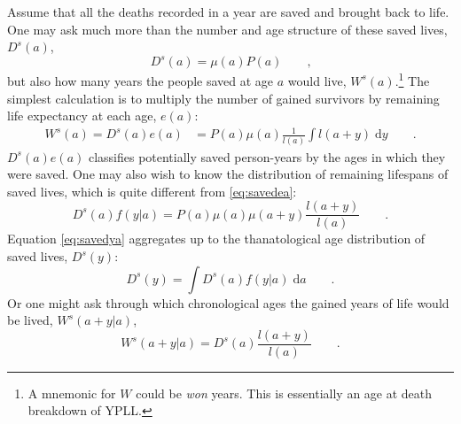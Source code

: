 \documentclass{article}
\newcommand{\dd}{\; \mathrm{d}}
\newcommand{\tc}{\quad\quad\text{,}}
\newcommand{\tp}{\quad\quad\text{.}}
\begin{document}
\begin{appendices}
Assume that all the deaths recorded in a year are saved and brought back to
life. One may ask much more than the number and age structure of these saved
lives, $D^s(a)$,
\begin{equation}
\label{eq:Dsa}
D^s(a) = \mu(a)P(a) \tc
\end{equation}
but also how many years the people saved at age $a$ would live, 
$W^s(a)$.\footnote{A mnemonic for $W$ could be \textit{won} years. This is
essentially an age at death breakdown of YPLL.} The simplest calculation is
to multiply the number of gained survivors by remaining life expectancy at each
age, $e(a)$:
\begin{align}
\label{eq:savedea}
W^s(a) = D^s(a)e(a) &= P(a)\mu(a)\frac{1}{l(a)}\int l(a+y) \dd y \tp
\end{align}
$D^s(a)e(a)$ classifies potentially saved person-years by the
ages in which they were saved. One may also wish to know the distribution of remaining lifespans of saved
lives, which is quite different from \eqref{eq:savedea}:
\begin{equation}
\label{eq:savedya}
D^s(a)f(y|a) = P(a)\mu(a)\mu(a+y) \frac{l(a+y)}{l(a)} \tp
\end{equation}
Equation \eqref{eq:savedya} aggregates up to the thanatological age distribution
of saved lives, $D^s(y)$:
\begin{equation}
\label{eq:savedy}
D^s(y) = \int D^s(a)f(y|a) \dd a \tp
\end{equation}
Or one might ask through which chronological ages the gained years of life
would be lived, $W^s(a+y|a)$,
\begin{equation}
\label{eq:gaineday}
W^s(a+y|a) = D^s(a)\frac{l(a+y)}{l(a)} \tp
\end{equation}


\end{appendices}
\end{document}
